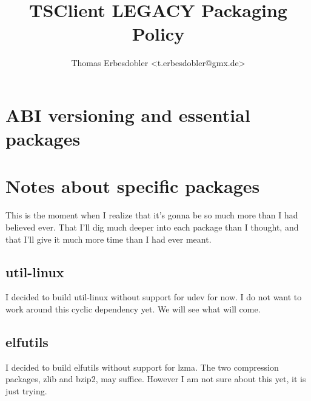 \documentclass[a4paper]{article}
\title{TSClient LEGACY Packaging Policy}
\author{Thomas Erbesdobler <t.erbesdobler@gmx.de>}
\begin{document}
	\maketitle
	\tableofcontents

	\section{ABI versioning and essential packages}
	
	\section{Notes about specific packages}
	
	This is the moment when I realize that it's gonna be so much more than I had believed ever. That I'll dig much deeper into each package than I thought, and that I'll give it much more time than I had ever meant.
	
	\subsection{util-linux}
	
	I decided to build util-linux without support for udev for now. I do not want to work around this cyclic dependency yet. We will see what will come.
	
	\subsection{elfutils}
	
	I decided to build elfutils without support for lzma. The two compression packages, zlib and bzip2, may suffice. However I am not sure about this yet, it is just trying.
\end{document}

